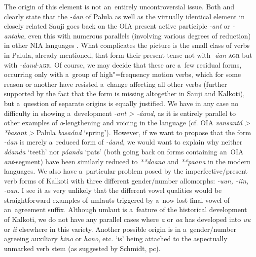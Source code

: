 The origin of this element is not an~entirely uncontroversial issue. Both \citet[22]{morgenstierne1941} and \citet[48]{buddruss1967} clearly state that the \textit{-áan} of Palula as well as the virtually identical element in closely related Sauji goes back on the OIA present active participle \textit{-ant} or \textit{-antaka}, even this with numerous parallels (involving various degrees of reduction) in other NIA languages \citep[270--271]{masica1991}. What complicates the picture is the small class of verbs in Palula, already mentioned, that form their present tense not with \textit{-áan}-\textsc{agr} but with \textit{-áand}-\textsc{agr}. Of course, we may decide that these are a~few residual forms, occurring only with a~group of high"=frequency motion verbs, which for some reason or another have resisted a~change affecting all other verbs (further supported by the fact that the form is missing altogether in Sauji and Kalkoti), but a~question of separate origins is equally justified. We have in any case no difficulty in showing a~development \textit{-ant {\textgreater} -áand}, as it is entirely parallel to other examples of \textit{a}-lengthening and voicing in the language (cf. OIA \textit{vansantá {\textgreater} *basant {\textgreater}} Palula \textit{basaánd} `spring'). However, if we want to propose that the form \textit{-áan} is merely a~reduced form of \textit{-áand}, we would want to explain why neither \textit{dáanda} `teeth' nor \textit{páanda} `pats' (both going back on forms containing an~OIA \textit{ant}-segment) have been similarly reduced to \textit{**daana} and \textit{**paana} in the modern languages. We also have a~particular problem posed by the imperfective/present verb forms of Kalkoti with three different gender/number allomorphs: \textit{-uun, -iin, -aan}. I see it as very unlikely that the different vowel qualities would be straightforward examples of umlauts triggered by a~now lost final vowel of an~agreement suffix. Although umlaut is a~feature of the historical development of Kalkoti, we do not have any parallel cases where \textit{‌a‌} or \textit{‌aa‌} has developed into \textit{‌uu‌} or \textit{‌ii‌} elsewhere in this variety. Another possible origin is in a~gender/number agreeing auxiliary \textit{hino} or \textit{hano}, etc. `is' being attached to the aspectually unmarked verb stem (as suggested by Schmidt, pc). 



